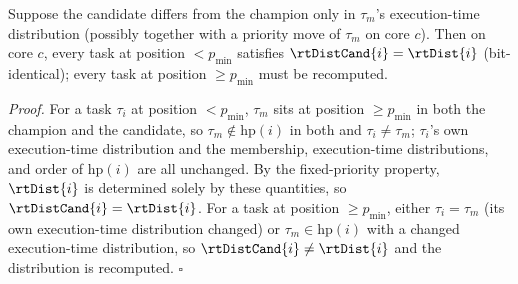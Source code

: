     \begin{lemma}
    \label{lem:rta_et_change}
    Suppose the candidate differs from the champion only in $\tau_m$'s execution-time distribution (possibly together with a priority move of $\tau_m$ on core $c$).
    Then on core $c$, every task at position $< p_{\min}$ satisfies $\rtDistCand{i} = \rtDist{i}$ (bit-identical); every task at position $\geq p_{\min}$ must be recomputed.
    \end{lemma}
    \noindent\textit{Proof.}
    For a task $\tau_i$ at position $< p_{\min}$, $\tau_m$ sits at position $\geq p_{\min}$ in both the champion and the candidate, so $\tau_m \notin \text{hp}(i)$ in both and $\tau_i \neq \tau_m$; $\tau_i$'s own execution-time distribution and the membership, execution-time distributions, and order of $\text{hp}(i)$ are all unchanged.
    By the fixed-priority property, $\rtDist{i}$ is determined solely by these quantities, so $\rtDistCand{i}=\rtDist{i}$.
    For a task at position $\geq p_{\min}$, either $\tau_i = \tau_m$ (its own execution-time distribution changed) or $\tau_m \in \text{hp}(i)$ with a changed execution-time distribution, so $\rtDistCand{i} \neq \rtDist{i}$ and the distribution is recomputed. \hfill$\square$

